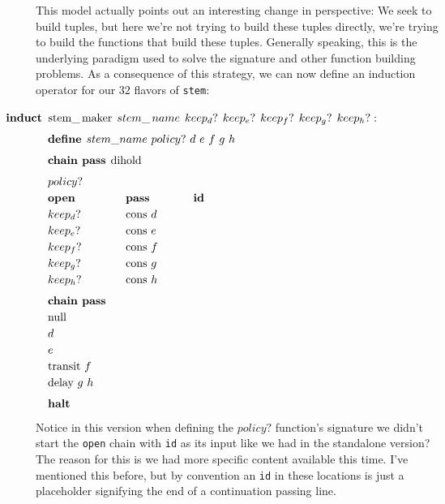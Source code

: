 \documentclass[twoside]{article}
\newcommand{\bfmbox}[1]{\mbox{\bfseries #1}}
\newcommand{\mss}[1]{\ensuremath{\mbox{\scriptsize #1}}}
\newcommand{\tab}[1][1.125cm]{\hspace{#1}}
\newcommand{\col}[1][0ex]{& \hspace{#1}}
\newcommand{\delay}{\mbox{delay}}
\newcommand{\transit}{\mbox{transit}}
\newcommand{\cons}{\mbox{cons}}
\newcommand{\induct}[1]{\bfmbox{induct}\mss{\,#1\,}}
\newcommand{\dihold}{\mbox{dihold}}
\begin{document}
This model actually points out an interesting change in perspective: We seek to build tuples, but here we're not trying
to build these tuples directly, we're trying to build the functions that build these tuples. Generally speaking,
this is the underlying paradigm used to solve the signature and other function building problems. As a consequence
of this strategy, we can now define an induction operator for our $ 32 $ flavors of \texttt{stem}:

$$ \def\arraystretch{1.2}
\tab[-3cm]\begin{array}{l}
\induct\ \mbox{stem\_\,maker} \tab[1ex] stem\_\,name
\tab[1ex] keep_d? \tab[1ex] keep_e? \tab[1ex] keep_f? \tab[1ex] keep_g? \tab[1ex] keep_h?:		\\[1ex]

\tab \begin{array}{lll}
\bfmbox{define}	\tab[1ex] stem\_name\ policy?\ d\ e\ f\ g\ h						\\[1ex]

\bfmbox{chain pass} \tab[1ex] \dihold									\\[1ex]

policy?													\\

\bfmbox{open}	\col[-3.75cm] \bfmbox{pass}	\col[5ex] \bfmbox{id}					\\
keep_d?		\col[-3.75cm] \cons\ d									\\
keep_e?		\col[-3.75cm] \cons\ e									\\
keep_f?		\col[-3.75cm] \cons\ f									\\
keep_g?		\col[-3.75cm] \cons\ g									\\
keep_h?		\col[-3.75cm] \cons\ h									\\[1ex]

\bfmbox{chain pass}											\\
\mbox{null}												\\
d													\\
e													\\
\transit\ f												\\
\delay\ g\ h												\\[1ex]

\bfmbox{halt}												\\
\end{array}
\end{array} $$
Notice in this version when defining the $ policy? $ function's signature we didn't start the \texttt{open}
chain with \texttt{id} as its input like we had in the standalone version? The reason for this is we had
more specific content available this time. I've mentioned this before, but by convention an \texttt{id}
in these locations is just a placeholder signifying the end of a continuation passing line.
\end{document}

